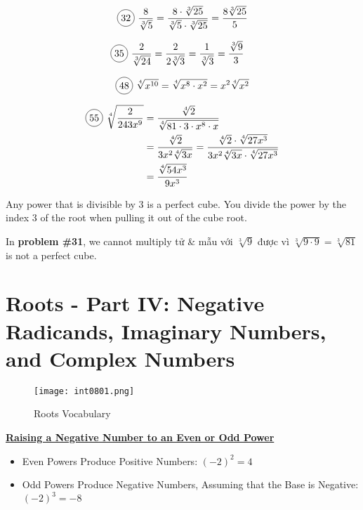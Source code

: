\begin{multicols}{2}
  \begin{align*}
    \circled{32}\ \frac{8}{\sqrt[3]{5}}=\frac{8\cdot \sqrt[3]{25}}{\sqrt[3]{5}\cdot \sqrt[3]{25}}=\frac{8\sqrt[3]{25}}{5}
  \end{align*}

  \begin{align*}
    \circled{35}\ \frac{2}{\sqrt[3]{24}}&=\frac{2}{2\sqrt[3]{3}}=\frac{1}{\sqrt[3]{3}}=\frac{\sqrt[3]{9}}{3}
  \end{align*}

  \begin{align*}
    \circled{48}\ \sqrt[4]{x^{10}}=\sqrt[4]{x^{8}\cdot x^{2}}=x^{2}\sqrt[4]{x^{2}}
  \end{align*}

  \begin{align*}
    \circled{55}\ \sqrt[4]{\frac{2}{243x^{9}}}&=\frac{\sqrt[4]{2}}{\sqrt[4]{81\cdot 3 \cdot x^{8}\cdot x}}\\
    &=\frac{\sqrt[4]{2}}{3x^{2}\sqrt[4]{3x}}=\frac{\sqrt[4]{2}\cdot\sqrt[4]{27x^{3}}}{3x^{2}\sqrt[4]{3x}\cdot \sqrt[4]{27x^{3}}}\\
    &=\frac{\sqrt[4]{54x^{3}}}{9x^{3}}
  \end{align*}
\end{multicols}

Any power that is divisible by 3 is a perfect cube. You divide the power by the index 3 of the root when pulling it out of the cube root.

In \textbf{problem \#31}, we cannot multiply tử \& mẫu với $\sqrt[3]{9}$ được vì $\sqrt[3]{9\cdot 9}=\sqrt[3]{81}$ is not a perfect cube.

\section{Roots - Part IV: Negative Radicands, Imaginary Numbers, and Complex Numbers}

\begin{figure}[htb!]
  \centering
  \texttt{[image: int0801.png]}
  \caption{Roots Vocabulary}
\end{figure}

\vspace{0.5 cm}

\centerline{\underline{\textbf{\large Raising a Negative Number to an Even or Odd Power}}}


\begin{itemize}
  \item Even Powers Produce Positive Numbers: $(-2)^{2}=4$
  \item Odd Powers Produce Negative Numbers, Assuming that the Base is Negative: $(-2)^{3}=-8$
\end{itemize}

